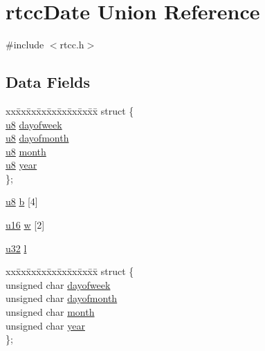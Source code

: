 \hypertarget{unionrtcc_date}{\section{rtcc\-Date Union Reference}
\label{unionrtcc_date}
}


{\ttfamily \#include $<$rtcc.\-h$>$}

\subsection*{Data Fields}
\begin{DoxyCompactItemize}
\item 
\begin{tabbing}
xx\=xx\=xx\=xx\=xx\=xx\=xx\=xx\=xx\=\kill
struct \{\\
\>\hyperlink{p8_2pinguino_2core_2typedef_8h_aed742c436da53c1080638ce6ef7d13de}{u8} \hyperlink{unionrtcc_date_a97419c23eb9097f89c83ce342df499f8}{dayofweek}\\
\>\hyperlink{p8_2pinguino_2core_2typedef_8h_aed742c436da53c1080638ce6ef7d13de}{u8} \hyperlink{unionrtcc_date_af980355fa766196214d34395ebed0a89}{dayofmonth}\\
\>\hyperlink{p8_2pinguino_2core_2typedef_8h_aed742c436da53c1080638ce6ef7d13de}{u8} \hyperlink{unionrtcc_date_ad5f8cd6773aef677b920ae4e4265bb10}{month}\\
\>\hyperlink{p8_2pinguino_2core_2typedef_8h_aed742c436da53c1080638ce6ef7d13de}{u8} \hyperlink{unionrtcc_date_ab02bacda75d48acac498f0c9f4e9b1cf}{year}\\
\}; \\

\end{tabbing}\item 
\hyperlink{p8_2pinguino_2core_2typedef_8h_aed742c436da53c1080638ce6ef7d13de}{u8} \hyperlink{unionrtcc_date_a462b9a1d97366cdca568e1212ab06255}{b} \mbox{[}4\mbox{]}
\item 
\hyperlink{p8_2pinguino_2core_2typedef_8h_a50b0d1c7a54fa09a64a3ac111c778520}{u16} \hyperlink{unionrtcc_date_aee6ae13fa41deb7b244fe96f8b34be1d}{w} \mbox{[}2\mbox{]}
\item 
\hyperlink{p8_2pinguino_2core_2typedef_8h_a2caf5cd7bcdbe1eefa727f44ffb10bac}{u32} \hyperlink{unionrtcc_date_a97b22435f07e68bf751cddd2226228ab}{l}
\item 
\begin{tabbing}
xx\=xx\=xx\=xx\=xx\=xx\=xx\=xx\=xx\=\kill
struct \{\\
\>unsigned char \hyperlink{unionrtcc_date_a162f414b3b2f1e40b9342af6400fc703}{dayofweek}\\
\>unsigned char \hyperlink{unionrtcc_date_a1831e463dfd771384f33f0019e242c4c}{dayofmonth}\\
\>unsigned char \hyperlink{unionrtcc_date_a4900720b55a67c901372712af062d615}{month}\\
\>unsigned char \hyperlink{unionrtcc_date_a189605ebe7fb094d2d8d511d855c4bb0}{year}\\
\}; \\


\end{tabbing}
\end{DoxyCompactItemize}
